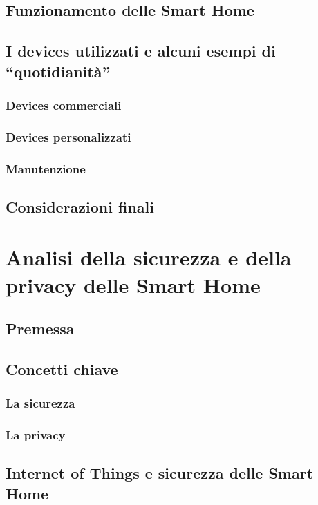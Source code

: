 \documentclass{article}
\begin{document}
\subsection{Funzionamento delle Smart Home}

\subsection{I devices utilizzati e alcuni esempi di “quotidianità”}

\subsubsection{Devices commerciali}

\subsubsection{Devices personalizzati}

\subsubsection{Manutenzione}

\subsection{Considerazioni finali}

\newpage
\section{Analisi della sicurezza e della privacy delle Smart Home}

\subsection{Premessa}

\subsection{Concetti chiave}

\subsubsection{La sicurezza}

\subsubsection{La privacy}

\subsection{Internet of Things e sicurezza delle Smart Home}
\end{document}
